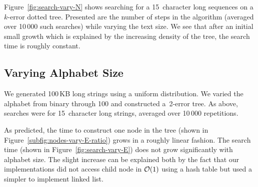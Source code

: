 Figure~\ref{fig:search-vary-N} shows searching for a 15~character long sequences on a $k$-error dotted tree. Presented are the number of steps in the algorithm (averaged over 10\,000 such searches) while varying the text size. We see that after an initial small growth which is explained by the increasing density of the tree, the search time is roughly constant.

\subsection{Varying Alphabet Size}
%
\begin{figure*}
\centering
{}
\caption{Construction time versus $|\Sigma|$}\label{fig:nodes-vary-E}
\end{figure*}%
%
\begin{figure*}
\centering
{}%
\caption{Searching versus $|\Sigma|$}\label{fig:search-vary-E}
\end{figure*}%
%
We generated 100\,KB long strings using a uniform distribution. We varied the alphabet from binary through 100 and constructed a~2-error tree. As above, searches were for 15~character long strings, averaged over 10\,000 repetitions.

As predicted, the time to construct one node in the tree (shown in Figure~\ref{subfig:nodes-vary-E-ratio}) grows in a roughly linear fashion. The search time (shown in Figure~\ref{fig:search-vary-E}) does not grow significantly with alphabet size. The slight increase can be explained both by the fact that our implementations did not access child node in $\mathcal{O}(1)$ using a hash table but used a simpler to implement linked list.
